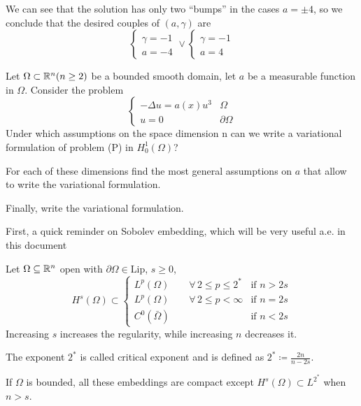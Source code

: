 We can see that the solution has only two ``bumps'' in the cases \(a = \pm 4\),
so we conclude that the desired couples of \((a, \gamma)\) are
\[
    \begin{cases}
        \gamma = -1 \\
        a = -4
    \end{cases}
    \vee
    \begin{cases}
        \gamma = -1 \\
        a = 4
    \end{cases}
\]
\newpage
\begin{exercise}
    Let \(\Omega \subset \mathbb{R}^n (n \geq 2)\) be a bounded smooth domain, let \(a\) be a measurable function in \(\Omega\).
    Consider the problem
    \[
        \begin{cases}
            - \Delta u = a(x) u^3 & \Omega         \\
            u = 0                 & \partial\Omega
        \end{cases}
        \tag*{(P)}
    \]
    Under which assumptions on the space dimension n can we write a variational
    formulation of problem (P) in \(H^1_0(\Omega)\)?

    For each of these dimensions find the most general assumptions on \(a\) that
    allow to write the variational formulation.

    Finally, write the variational formulation.
\end{exercise}

First, a quick reminder on Sobolev embedding, which will be very useful a.e. in
this document
\begin{remark}\label{sobolev_embedding}
    Let \(\Omega \subseteq \mathbb{R}^n\) open with \(\partial\Omega \in \text{Lip}\), \(s \geq 0\),
    \[
        H^s(\Omega) \subset
        \begin{cases}
            L^p(\Omega) \qquad \forall \, 2 \leq p \leq 2^* & \text{if } n > 2s \\
            L^p(\Omega) \qquad \forall \, 2 \leq p < \infty & \text{if } n = 2s \\
            C^0(\bar{\Omega})                               & \text{if } n < 2s
        \end{cases}
    \]
    Increasing \(s\) increases the regularity, while increasing \(n\) decreases it.

    The exponent \(2^*\) is called critical exponent and is defined as \(2^*
    \coloneqq \frac{2n}{n - 2s}\).

    If \(\Omega\) is bounded, all these embeddings are compact except \(H^s(\Omega)
    \subset L^{2^*}\) when \(n > s\).
\end{remark}

